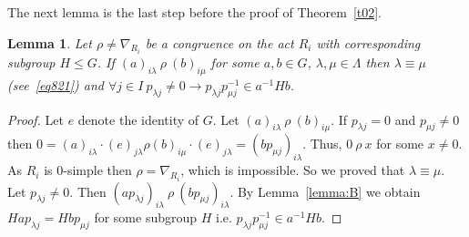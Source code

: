 \documentclass{birkau}
\numberwithin{equation}{section}
\theoremstyle{plain}
\newtheorem{lemma}[theorem]{Lemma}
\theoremstyle{definition}
\begin{document}
	The next lemma is the last step before the proof of Theorem~\ref{t02}.
	
	\begin{lemma} \label{lemma:C}
	    Let $\rho \neq \nabla_{R_i}$ be a congruence on the act $R_i$ with corresponding subgroup $H \leqslant G$. If $(a)_{i \lambda} \ \rho \ (b)_{i \mu}$ for some $a,b \in G$, $\lambda,\mu \in \Lambda $ then $\lambda \equiv \mu$ (see~\eqref{eq821}) and $\forall j \in I \ p_{\lambda j} \neq 0 \rightarrow p_{\lambda j} p_{\mu j}^{-1} \in a^{-1}Hb$.
	\end{lemma}
	\begin{proof}
	    Let $e$ denote the identity of $G$. Let $(a)_{i \lambda} \ \rho \ (b)_{i \mu}$. If $p_{\lambda j} = 0$ and $p_{\mu j} \neq 0$ then $0 = (a)_{i \lambda} \cdot (e)_{j \lambda} \rho (b)_{i \mu} \cdot (e)_{j \lambda} = (bp_{\mu j})_{i \lambda}$. Thus, $0 \ \rho \ x$ for some $x \neq 0$. As $R_i$ is 0-simple then $\rho = \nabla_{R_i}$, which is impossible. So we proved that $\lambda \equiv \mu$. Let $p_{\lambda j} \neq 0$. Then $(ap_{\lambda j})_{i \lambda} \ \rho \ (bp_{\mu j})_{i \lambda}$. By Lemma~\ref{lemma:B} we obtain $Hap_{\lambda j} = Hbp_{\mu j}$ for some subgroup $H$ i.e. $p_{\lambda j} p_{\mu j}^{-1} \in a^{-1}Hb$.
	\end{proof}
	
\end{document}

